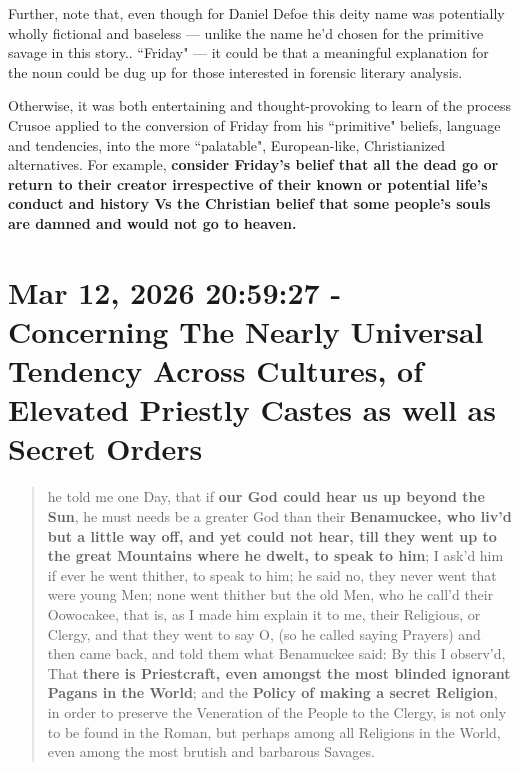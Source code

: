 \documentclass[a4paper]{article}
\begin{document}
Further, note that, even though for Daniel Defoe this deity name was potentially wholly fictional and baseless --- unlike the name he'd chosen for the primitive savage in this story.. ``Friday" --- it could be that a meaningful explanation for the noun could be dug up for those interested in forensic literary analysis. 

Otherwise, it was both entertaining and thought-provoking to learn of the process Crusoe applied to the conversion of Friday from his ``primitive" beliefs, language and tendencies, into the more ``palatable", European-like, Christianized alternatives. For example, \textbf{consider Friday's belief that all the dead go or return to their creator irrespective of their known or potential life's conduct and history Vs the Christian belief that some people's souls are damned and would not go to heaven.}





\section{Mar 12, 2026 20:59:27 - Concerning The Nearly Universal Tendency Across Cultures, of Elevated Priestly Castes as well as Secret Orders}
\label{SEC57}


\noindent
\begin{minipage}{1\textwidth}
\vspace{1em}
\begin{quotation}
{\ttfamily


he told me one Day, that if \textbf{our God could hear us up beyond the Sun}, he must needs be a greater God than their \textbf{Benamuckee, who liv’d but a little way off, and yet could not hear, till they went up to the great Mountains where he dwelt, to speak to him}; I ask’d him if ever he went thither, to speak to him; he said no, they never went that were young Men; none went thither but the old Men, who he call’d their Oowocakee, that is, as I made him explain it to me, their Religious, or Clergy, and that they went to say O, (so he called saying Prayers) and then came back, and told them what Benamuckee said: By this I observ’d, That \textbf{there is Priestcraft, even amongst the most blinded ignorant Pagans in the World}; and the \textbf{Policy of making a secret Religion}, in order to preserve the Veneration of the People to the Clergy, is not only to be found in the Roman, but perhaps among all Religions in the World, even among the most brutish and barbarous Savages.


}
\end{quotation}
\vspace{1em}
\end{minipage}
\end{document}
